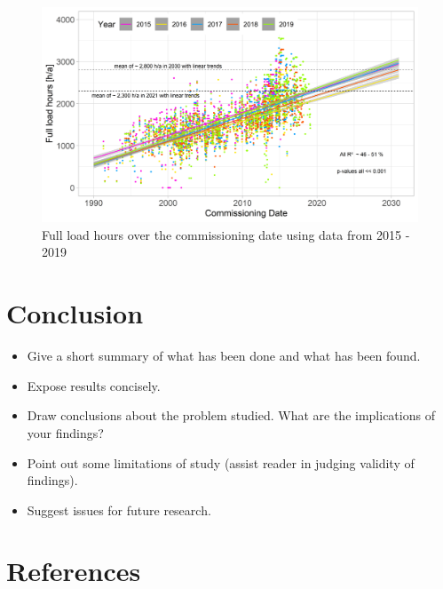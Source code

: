 \documentclass[a4paper,11pt]{article}
\begin{document}
\begin{figure}

{\centering \includegraphics[width=1\linewidth]{data/Amprion/results_of_analysis/flh} 

}

\caption{Full load hours over the commissioning date using data from 2015 - 2019}\label{fig:full}
\end{figure}
\hypertarget{conclusion}{%
\section{Conclusion}\label{conclusion}}
\begin{itemize}
\item
  Give a short summary of what has been done and what has been found.
\item
  Expose results concisely.
\item
  Draw conclusions about the problem studied. What are the implications of your
  findings?
\item
  Point out some limitations of study (assist reader in judging validity of
  findings).
\item
  Suggest issues for future research.
\end{itemize}
\newpage

\hypertarget{references}{%
\section*{References}\label{references}}

\noindent

\setlength{\parindent}{-0.5cm}
\setlength{\leftskip}{0.5cm}
\setlength{\parskip}{8pt}
\end{document}
